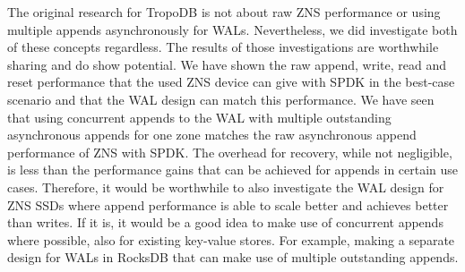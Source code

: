 The original research for TropoDB is not about raw ZNS performance or using multiple appends asynchronously for WALs. Nevertheless, we did investigate both of these concepts regardless. The results of those investigations are worthwhile sharing and do show potential. We have shown the raw append, write, read and reset performance that the used ZNS device can give with SPDK in the best-case scenario and that the WAL design can match this performance. We have seen that using concurrent appends to the WAL with multiple outstanding asynchronous appends for one zone matches the raw asynchronous append performance of ZNS with SPDK. The overhead for recovery, while not negligible, is less than the performance gains that can be achieved for appends in certain use cases. Therefore, it would be worthwhile to also investigate the WAL design for ZNS SSDs where append performance is able to scale better and achieves better than writes. If it is, it would be a good idea to make use of concurrent appends where possible, also for existing key-value stores. For example, making a separate design for WALs in RocksDB that can make use of multiple outstanding appends.

